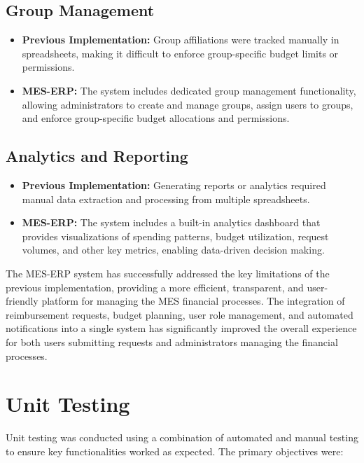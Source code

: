 \documentclass[12pt, titlepage]{article}
\begin{document}
\subsection{Group Management}

\begin{itemize}
    \item \textbf{Previous Implementation:} Group affiliations were tracked manually in spreadsheets, making it difficult to enforce group-specific budget limits or permissions.
    
    \item \textbf{MES-ERP:} The system includes dedicated group management functionality, allowing administrators to create and manage groups, assign users to groups, and enforce group-specific budget allocations and permissions.
\end{itemize}

\subsection{Analytics and Reporting}

\begin{itemize}
    \item \textbf{Previous Implementation:} Generating reports or analytics required manual data extraction and processing from multiple spreadsheets.
    
    \item \textbf{MES-ERP:} The system includes a built-in analytics dashboard that provides visualizations of spending patterns, budget utilization, request volumes, and other key metrics, enabling data-driven decision making.
\end{itemize}

The MES-ERP system has successfully addressed the key limitations of the previous implementation, providing a more efficient, transparent, and user-friendly platform for managing the MES financial processes. The integration of reimbursement requests, budget planning, user role management, and automated notifications into a single system has significantly improved the overall experience for both users submitting requests and administrators managing the financial processes.

\section{Unit Testing}

Unit testing was conducted using a combination of automated and manual testing to ensure key functionalities worked as expected. The primary objectives were:
\end{document}
